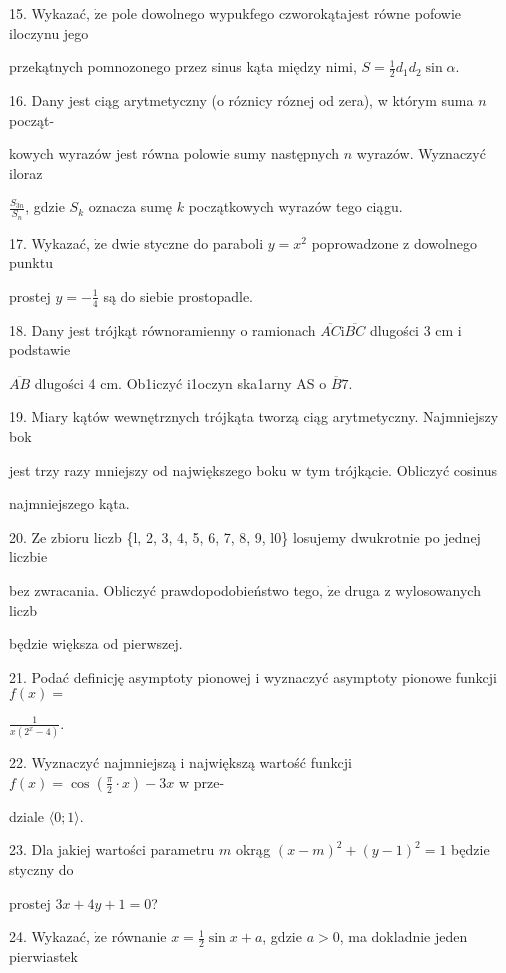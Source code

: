 \documentclass[a4paper,12pt]{article}
\begin{document}
15. Wykazać, $\dot{\mathrm{z}}\mathrm{e}$ pole dowolnego wypukfego czworokątajest równe pofowie iloczynu jego

przekątnych pomnozonego przez sinus kąta między nimi, $S=\displaystyle \frac{1}{2}d_{1}d_{2}\sin\alpha.$

16. Dany jest ciąg arytmetyczny (o róznicy róznej od zera), w którym suma $n$ począt-

kowych wyrazów jest równa polowie sumy następnych $n$ wyrazów. Wyznaczyć iloraz

$\displaystyle \frac{S_{3n}}{S_{n}}$, gdzie $S_{k}$ oznacza sumę $k$ początkowych wyrazów tego ciągu.

17. Wykazać, $\dot{\mathrm{z}}\mathrm{e}$ dwie styczne do paraboli $y=x^{2}$ poprowadzone z dowolnego punktu

prostej $y=-\displaystyle \frac{1}{4}$ są do siebie prostopadle.

18. Dany jest trójkąt równoramienny o ramionach $\overline{AC}\mathrm{i}\overline{BC}$ dlugości 3 cm i podstawie

$\overline{AB}$ dlugości 4 cm. Ob1iczyć i1oczyn ska1arny AS o $\overline{B}7.$

19. Miary kątów wewnętrznych trójkąta tworzą ciąg arytmetyczny. Najmniejszy bok

jest trzy razy mniejszy od największego boku w tym trójkącie. Obliczyć cosinus

najmniejszego kąta.

20. Ze zbioru liczb \{l, 2, 3, 4, 5, 6, 7, 8, 9, l0\} losujemy dwukrotnie po jednej liczbie

bez zwracania. Obliczyć prawdopodobieństwo tego, $\dot{\mathrm{z}}\mathrm{e}$ druga z wylosowanych liczb

będzie większa od pierwszej.

21. Podać definicję asymptoty pionowej i wyznaczyć asymptoty pionowe funkcji $f(x)=$

$\displaystyle \frac{1}{x(2^{x}-4)}.$

22. Wyznaczyć najmniejszą i największą wartość funkcji $f(x)=\displaystyle \cos(\frac{\pi}{2}\cdot x)-3x$ w prze-

dziale $\langle 0;1\rangle.$

23. Dla jakiej wartości parametru $m$ okrąg $(x-m)^{2}+(y-1)^{2}=1$ będzie styczny do

prostej $3x+4y+1=0$?

24. Wykazać, $\dot{\mathrm{z}}\mathrm{e}$ równanie $x=\displaystyle \frac{1}{2}\sin x+a$, gdzie $a>0$, ma dokladnie jeden pierwiastek
\end{document}
